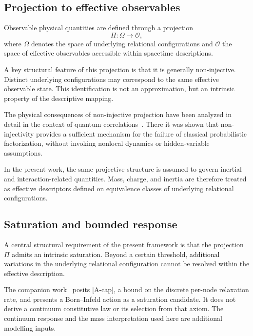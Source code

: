 \documentclass[pdflatex,sn-mathphys-num]{sn-jnl} %
\theoremstyle{remark}
\begin{document}
    \subsection{Projection to effective observables}
      \label{subsec:projection}

      Observable physical quantities are defined through a projection
      \begin{equation}
        \Pi : \Omega \rightarrow \mathcal{O},
      \end{equation}
      where $\Omega$ denotes the space of underlying relational configurations and
      $\mathcal{O}$ the space of effective observables accessible within spacetime
      descriptions.

      A key structural feature of this projection is that it is generally
      non-injective.
      Distinct underlying configurations may correspond to the same effective
      observable state.
      This identification is not an approximation, but an intrinsic property of the
      descriptive mapping.

      The physical consequences of non-injective projection have been analyzed in
      detail in the context of quantum correlations~\cite{Beau2026b}.
      There it was shown that non-injectivity provides a sufficient mechanism for the
      failure of classical probabilistic factorization, without invoking nonlocal
      dynamics or hidden-variable assumptions.

      In the present work, the same projective structure is assumed to govern inertial
      and interaction-related quantities.
      Mass, charge, and inertia are therefore treated as effective descriptors defined
      on equivalence classes of underlying relational configurations.

    \subsection{Saturation and bounded response}
      \label{subsec:saturation}

      A central structural requirement of the present framework is that the projection
      $\Pi$ admits an intrinsic saturation.
      Beyond a certain threshold, additional variations in the underlying relational
      configuration cannot be resolved within the effective description.

      The companion work~\cite{Beau2026c} posits [A-cap], a bound on the discrete per-node
      relaxation rate, and presents a Born--Infeld action as a saturation candidate.
      It does not derive a continuum constitutive law or its selection from that axiom.
      The continuum response and the mass interpretation used here are additional modelling inputs.
\end{document}
